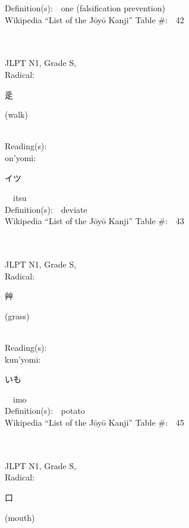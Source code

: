 \begin{multicols}{2}
Definition(s):\ \ one (falsification prevention) \\
Wikipedia ``List of the J\=oy\=o Kanji'' Table \#:\ \ 42 \\
\ \ \\
{\fontsize{34pt}{40pt}  }\ \ \\
{JLPT N1, Grade S, \\Radical:\ \ {\begin{CJK}{UTF8}{min} 辵 \end{CJK}} (walk) } \\
Reading(s):\ \ \\
{\hspace*{1em}}on'yomi:\ \ \\
{\hspace*{2em}}{\begin{CJK}{UTF8}{min} イツ \end{CJK}}\ \ itsu\ \ \\
Definition(s):\ \ deviate \\
Wikipedia ``List of the J\=oy\=o Kanji'' Table \#:\ \ 43 \\
\ \ \\
{\fontsize{34pt}{40pt}  }\ \ \\
{JLPT N1, Grade S, \\Radical:\ \ {\begin{CJK}{UTF8}{min} 艸 \end{CJK}} (grass) } \\
Reading(s):\ \ \\
{\hspace*{1em}}kun'yomi:\ \ \\
{\hspace*{2em}}{\begin{CJK}{UTF8}{min} いも \end{CJK}}\ \ imo\ \ \\
Definition(s):\ \ potato \\
Wikipedia ``List of the J\=oy\=o Kanji'' Table \#:\ \ 45 \\
\ \ \\
{\fontsize{34pt}{40pt}  }\ \ \\
{JLPT N1, Grade S, \\Radical:\ \ {\begin{CJK}{UTF8}{min} 口 \end{CJK}} (mouth) } \\

\end{multicols}
